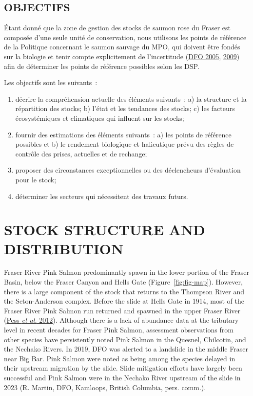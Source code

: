 \documentclass[french,11pt]{book}
\begin{document}
\hypertarget{objectifs}{%
\subsection{OBJECTIFS}\label{objectifs}}

Étant donné que la zone de gestion des stocks de saumon rose du Fraser est composée d'une seule unité de conservation, nous utilisons les points de référence de la Politique concernant le saumon sauvage du MPO, qui doivent être fondés sur la biologie et tenir compte explicitement de l'incertitude (\protect\hyperlink{ref-dfoCanadaPolicyConservation2005}{DFO 2005}, \protect\hyperlink{ref-dfoFisheryDecisionmakingFramework2009}{2009}) afin de déterminer les points de référence possibles selon les DSP.

Les objectifs sont les suivants~:
\begin{enumerate}
\def\labelenumi{\arabic{enumi}.}
\item
  décrire la compréhension actuelle des éléments suivants~: a) la structure et la répartition des stocks; b) l'état et les tendances des stocks; c) les facteurs écosystémiques et climatiques qui influent sur les stocks;
\item
  fournir des estimations des éléments suivants~: a) les points de référence possibles et b) le rendement biologique et halieutique prévu des règles de contrôle des prises, actuelles et de rechange;
\item
  proposer des circonstances exceptionnelles ou des déclencheurs d'évaluation pour le stock;
\item
  déterminer les secteurs qui nécessitent des travaux futurs.
\end{enumerate}
\hypertarget{stock-structure-and-distribution}{%
\section{STOCK STRUCTURE AND DISTRIBUTION}\label{stock-structure-and-distribution}}

Fraser River Pink Salmon predominantly spawn in the lower portion of the Fraser Basin, below the Fraser Canyon and Hells Gate (Figure~\ref{fig:fig-map}). However, there is a large component of the stock that returns to the Thompson River and the Seton-Anderson complex. Before the slide at Hells Gate in 1914, most of the Fraser River Pink Salmon run returned and spawned in the upper Fraser River (\protect\hyperlink{ref-pessInfluencePopulationDynamics2012}{Pess \emph{et al.} 2012}). Although there is a lack of abundance data at the tributary level in recent decades for Fraser Pink Salmon, assessment observations from other species have persistently noted Pink Salmon in the Quesnel, Chilcotin, and the Nechako Rivers. In 2019, DFO was alerted to a landslide in the middle Fraser near Big Bar. Pink Salmon were noted as being among the species delayed in their upstream migration by the slide. Slide mitigation efforts have largely been successful and Pink Salmon were in the Nechako River upstream of the slide in 2023 (R. Martin, DFO, Kamloops, British Columbia, pers. comm.).
\end{document}
